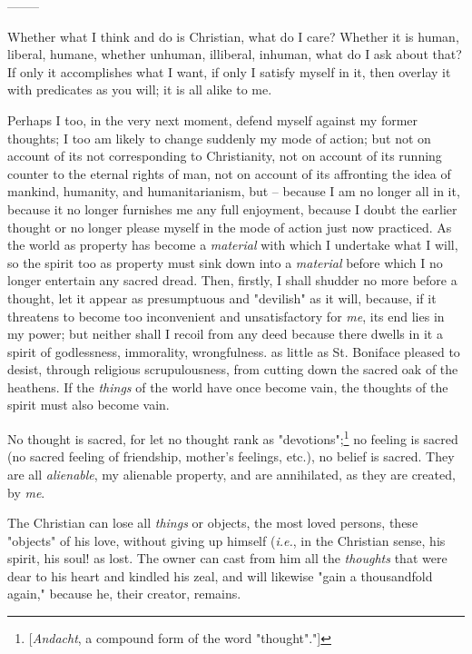 \documentclass[a4paper]{book}
\begin{document}
\begin{center}
--------\end{center}


Whether what I think and do is Christian, what do I care? Whether it is human, 
liberal, humane, whether unhuman, illiberal, inhuman, what do I ask about 
that? If only it accomplishes what I want, if only I satisfy myself in it, 
then overlay it with predicates as you will; it is all alike to me.

Perhaps I too, in the very next moment, defend myself against my former 
thoughts; I too am likely to change suddenly my mode of action; but not on 
account of its not corresponding to Christianity, not on account of its 
running counter to the eternal rights of man, not on account of its affronting 
the idea of mankind, humanity, and humanitarianism, but -- because I am no 
longer all in it, because it no longer furnishes me any full enjoyment, 
because I doubt the earlier thought or no longer please myself in the mode of 
action just now practiced. As the world as property has become a 
\textit{material} with which I undertake what I will, so the spirit too as 
property must sink down into a \textit{material} before which I no longer 
entertain any sacred dread. Then, firstly, I shall shudder no more before a 
thought, let it appear as presumptuous and "{}devilish"{} as it will, because, 
if it threatens to become too inconvenient and unsatisfactory for \textit{me}, 
its end lies in my power; but neither shall I recoil from any deed because 
there dwells in it a spirit of godlessness, immorality, wrongfulness. as 
little as St. Boniface pleased to desist, through religious scrupulousness, 
from cutting down the sacred oak of the heathens. If the \textit{things} of 
the world have once become vain, the thoughts of the spirit must also become 
vain.

No thought is sacred, for let no thought rank as 
"{}devotions"{};\footnote{[\textit{Andacht}, a compound form of the word 
"{}thought"{}."{}]} no feeling is sacred (no sacred feeling of friendship, 
mother's feelings, etc.), no belief is sacred. They are all 
\textit{alienable}, my alienable property, and are annihilated, as they are 
created, by \textit{me}.

The Christian can lose all \textit{things} or objects, the most loved persons, 
these "{}objects"{} of his love, without giving up himself (\textit{i.e.}, in 
the Christian sense, his spirit, his soul! as lost. The owner can cast from 
him all the \textit{thoughts} that were dear to his heart and kindled his 
zeal, and will likewise "{}gain a thousandfold again,"{} because he, their 
creator, remains.
\end{document}
